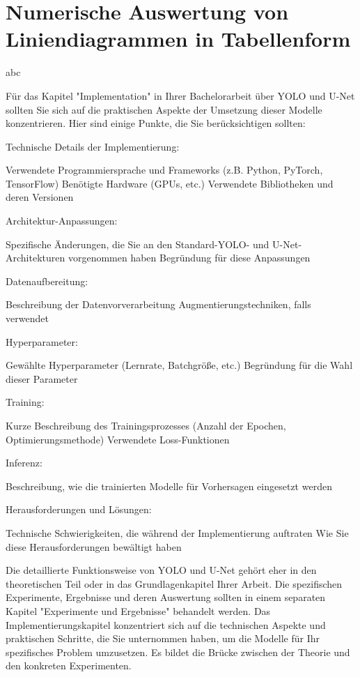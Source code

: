 \section{Numerische Auswertung von Liniendiagrammen in Tabellenform}
abc



Für das Kapitel "Implementation" in Ihrer Bachelorarbeit über YOLO und U-Net sollten Sie sich auf die praktischen Aspekte der Umsetzung dieser Modelle konzentrieren. Hier sind einige Punkte, die Sie berücksichtigen sollten:

Technische Details der Implementierung:

Verwendete Programmiersprache und Frameworks (z.B. Python, PyTorch, TensorFlow)
Benötigte Hardware (GPUs, etc.)
Verwendete Bibliotheken und deren Versionen


Architektur-Anpassungen:

Spezifische Änderungen, die Sie an den Standard-YOLO- und U-Net-Architekturen vorgenommen haben
Begründung für diese Anpassungen


Datenaufbereitung:

Beschreibung der Datenvorverarbeitung
Augmentierungstechniken, falls verwendet


Hyperparameter:

Gewählte Hyperparameter (Lernrate, Batchgröße, etc.)
Begründung für die Wahl dieser Parameter


Training:

Kurze Beschreibung des Trainingsprozesses (Anzahl der Epochen, Optimierungsmethode)
Verwendete Loss-Funktionen


Inferenz:

Beschreibung, wie die trainierten Modelle für Vorhersagen eingesetzt werden


Herausforderungen und Lösungen:

Technische Schwierigkeiten, die während der Implementierung auftraten
Wie Sie diese Herausforderungen bewältigt haben



Die detaillierte Funktionsweise von YOLO und U-Net gehört eher in den theoretischen Teil oder in das Grundlagenkapitel Ihrer Arbeit. Die spezifischen Experimente, Ergebnisse und deren Auswertung sollten in einem separaten Kapitel "Experimente und Ergebnisse" behandelt werden.
Das Implementierungskapitel konzentriert sich auf die technischen Aspekte und praktischen Schritte, die Sie unternommen haben, um die Modelle für Ihr spezifisches Problem umzusetzen. Es bildet die Brücke zwischen der Theorie und den konkreten Experimenten.